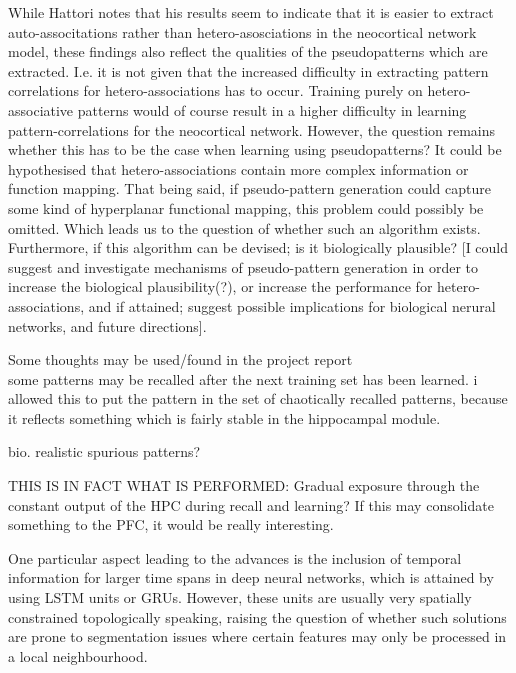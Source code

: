 
While Hattori notes that his results seem to indicate that it is easier to extract auto-associtations rather than hetero-asosciations in the neocortical network model, these findings also reflect the qualities of the pseudopatterns which are extracted. I.e. it is not given that the increased difficulty in extracting pattern correlations for hetero-associations has to occur. Training purely on hetero-associative patterns would of course result in a higher difficulty in learning pattern-correlations for the neocortical network. However, the question remains whether this has to be the case when learning using pseudopatterns? It could be hypothesised that hetero-associations contain more complex information or function mapping. That being said, if pseudo-pattern generation could capture some kind of hyperplanar functional mapping, this problem could possibly be omitted. Which leads us to the question of whether such an algorithm exists. Furthermore, if this algorithm can be devised; is it biologically plausible? [I could suggest and investigate mechanisms of pseudo-pattern generation in order to increase the biological plausibility(?), or increase the performance for hetero-associations, and if attained; suggest possible implications for biological nerural networks, and future directions].

Some thoughts may be used/found in the project report
\\
some patterns may be recalled after the next training set has been learned. i allowed this to put the pattern in the set of chaotically recalled patterns, because it reflects something which is fairly stable in the hippocampal module.

bio. realistic spurious patterns?

THIS IS IN FACT WHAT IS PERFORMED: Gradual exposure through the constant output of the HPC during recall and learning? If this may consolidate something to the PFC, it would be really interesting.

One particular aspect leading to the advances is the inclusion of temporal information for larger time spans in deep neural networks, which is attained by using LSTM units or GRUs. However, these units are usually very spatially constrained topologically speaking, raising the question of whether such solutions are prone to segmentation issues where certain features may only be processed in a local neighbourhood.
\\\\

